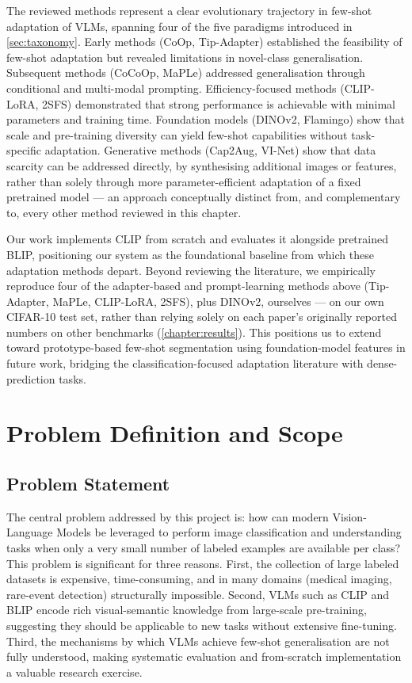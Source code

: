 \documentclass{iutbscthesis}
\begin{document}
The reviewed methods represent a clear evolutionary trajectory in few-shot adaptation of VLMs, spanning four of the five paradigms introduced in \autoref{sec:taxonomy}. Early methods (CoOp, Tip-Adapter) established the feasibility of few-shot adaptation but revealed limitations in novel-class generalisation. Subsequent methods (CoCoOp, MaPLe) addressed generalisation through conditional and multi-modal prompting. Efficiency-focused methods (CLIP-LoRA, 2SFS) demonstrated that strong performance is achievable with minimal parameters and training time. Foundation models (DINOv2, Flamingo) show that scale and pre-training diversity can yield few-shot capabilities without task-specific adaptation. Generative methods (Cap2Aug, VI-Net) show that data scarcity can be addressed directly, by synthesising additional images or features, rather than solely through more parameter-efficient adaptation of a fixed pretrained model --- an approach conceptually distinct from, and complementary to, every other method reviewed in this chapter.

Our work implements CLIP from scratch and evaluates it alongside pretrained BLIP, positioning our system as the foundational baseline from which these adaptation methods depart. Beyond reviewing the literature, we empirically reproduce four of the adapter-based and prompt-learning methods above (Tip-Adapter, MaPLe, CLIP-LoRA, 2SFS), plus DINOv2, ourselves --- on our own CIFAR-10 test set, rather than relying solely on each paper's originally reported numbers on other benchmarks (\autoref{chapter:results}). This positions us to extend toward prototype-based few-shot segmentation using foundation-model features in future work, bridging the classification-focused adaptation literature with dense-prediction tasks.

\chapter{Problem Definition and Scope}

\section{Problem Statement}

The central problem addressed by this project is: how can modern Vision-Language Models be leveraged to perform image classification and understanding tasks when only a very small number of labeled examples are available per class? This problem is significant for three reasons. First, the collection of large labeled datasets is expensive, time-consuming, and in many domains (medical imaging, rare-event detection) structurally impossible. Second, VLMs such as CLIP and BLIP encode rich visual-semantic knowledge from large-scale pre-training, suggesting they should be applicable to new tasks without extensive fine-tuning. Third, the mechanisms by which VLMs achieve few-shot generalisation are not fully understood, making systematic evaluation and from-scratch implementation a valuable research exercise.
\end{document}
